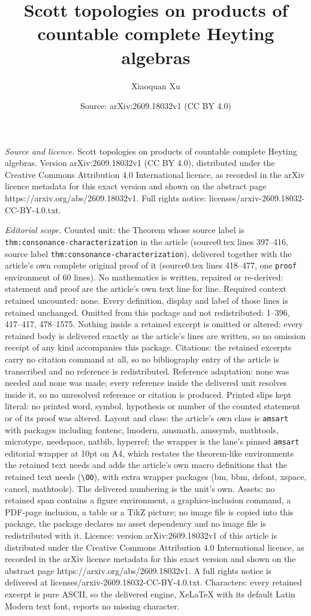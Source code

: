 \documentclass[10pt,a4paper]{amsart}
\title[Scott topologies on products of countable complete Heyting a]{Scott topologies on products of countable complete Heyting algebras}
\author{Xiaoquan Xu}
\date{Source: arXiv:2609.18032v1 (CC BY 4.0)}
\begin{document}
\maketitle

\noindent\emph{Source and licence.} Scott topologies on products of countable complete Heyting algebras. Version arXiv:2609.18032v1 (CC BY 4.0), distributed under the Creative Commons Attribution 4.0 International licence, as recorded in the arXiv licence metadata for this exact version and shown on the abstract page https://arxiv.org/abs/2609.18032v1. Full rights notice: licenses/arxiv-2609.18032-CC-BY-4.0.txt.\par\smallskip

\noindent\textit{Editorial scope.} Counted unit: the Theorem whose source label is \texttt{thm:consonance-characterization} in the article (source0.tex lines 397--416, source label \texttt{thm:consonance-characterization}), delivered together with the article's own complete original proof of it (source0.tex lines 418--477, one \texttt{proof} environment of 60 lines). No mathematics is written, repaired or re-derived: statement and proof are the article's own text line for line. Required context retained uncounted: none. Every definition, display and label of those lines is retained unchanged. Omitted from this package and not redistributed: 1--396, 417--417, 478--1575. Nothing inside a retained excerpt is omitted or altered: every retained body is delivered exactly as the article's lines are written, so no omission receipt of any kind accompanies this package. Citations: the retained excerpts carry no citation command at all, so no bibliography entry of the article is transcribed and no reference is redistributed. Reference adaptation: none was needed and none was made; every reference inside the delivered unit resolves inside it, so no unresolved reference or citation is produced. Printed slips kept literal: no printed word, symbol, hypothesis or number of the counted statement or of its proof was altered. Layout and class: the article's own class is \texttt{amsart} with packages including fontenc, lmodern, amsmath, amssymb, mathtools, microtype, needspace, natbib, hyperref; the wrapper is the lane's pinned \texttt{amsart} editorial wrapper at 10pt on A4, which restates the theorem-like environments the retained text needs and adds the article's own macro definitions that the retained text needs (\texttt{\textbackslash OO}), with extra wrapper packages (bm, bbm, dsfont, xspace, cancel, mathtools). The delivered numbering is the unit's own. Assets: no retained span contains a figure environment, a graphics-inclusion command, a PDF-page inclusion, a table or a TikZ picture; no image file is copied into this package, the package declares no asset dependency and no image file is redistributed with it. Licence: version arXiv:2609.18032v1 of this article is distributed under the Creative Commons Attribution 4.0 International licence, as recorded in the arXiv licence metadata for this exact version and shown on the abstract page https://arxiv.org/abs/2609.18032v1. A full rights notice is delivered at licenses/arxiv-2609.18032-CC-BY-4.0.txt. Characters: every retained excerpt is pure ASCII, so the delivered engine, XeLaTeX with its default Latin Modern text font, reports no missing character.
\end{document}

